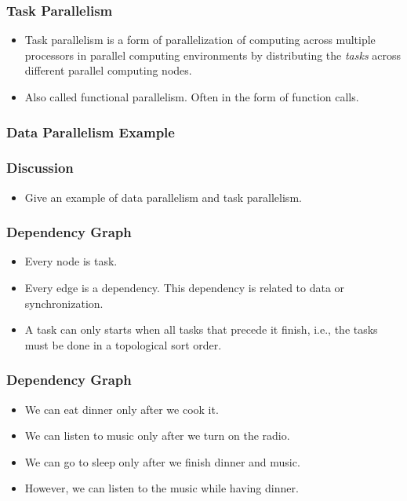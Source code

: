 \documentclass{beamer}
\begin{document}
\begin{CJK}{UTF8}{bsmi}
\begin{frame}
\frametitle{Task Parallelism} 
\begin{itemize}
\item Task parallelism is a form of parallelization of computing
  across multiple processors in parallel computing environments by
  distributing the {\em tasks} across different parallel computing
  nodes.
\item Also called functional parallelism.  Often in the form of
  function calls.
\end{itemize}
\end{frame}

\begin{frame}
\frametitle{Data Parallelism Example}
\end{frame}


\begin{frame}
\frametitle{Discussion} 
\begin{itemize}
\item Give an example of data parallelism and task parallelism.
\end{itemize}
\end{frame}


\begin{frame}
\frametitle{Dependency Graph}
\begin{itemize}
\item Every node is task.
\item Every edge is a dependency.  This dependency is related to data
  or synchronization.
\item A task can only starts when all tasks that precede it finish,
  i.e., the tasks must be done in a topological sort order.
\end{itemize}
\end{frame}

\begin{frame}
\frametitle{Dependency Graph}
\begin{itemize}
\item We can eat dinner only after we cook it. 
\item We can listen to music only after we turn on the radio.
\item We can go to sleep only after we finish dinner and music.
\item However, we can listen to the music while having dinner.
\end{itemize}
\end{frame}


\end{CJK}
\end{document}
